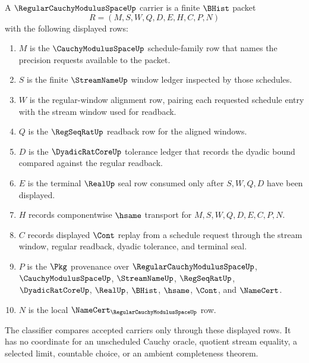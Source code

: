 \begin{definition}
\label{def:regular-cauchy-modulus-space-carrier}
A $\RegularCauchyModulusSpaceUp$ carrier is a finite $\BHist$ packet
$$
R=(M,S,W,Q,D,E,H,C,P,N)
$$
with the following displayed rows:
\begin{enumerate}
\item $M$ is the $\CauchyModulusSpaceUp$ schedule-family row that names the
precision requests available to the packet.
\item $S$ is the finite $\StreamNameUp$ window ledger inspected by those
schedules.
\item $W$ is the regular-window alignment row, pairing each requested schedule
entry with the stream window used for readback.
\item $Q$ is the $\RegSeqRatUp$ readback row for the aligned windows.
\item $D$ is the $\DyadicRatCoreUp$ tolerance ledger that records the dyadic
bound compared against the regular readback.
\item $E$ is the terminal $\RealUp$ seal row consumed only after $S,W,Q,D$ have
been displayed.
\item $H$ records componentwise $\hsame$ transport for $M,S,W,Q,D,E,C,P,N$.
\item $C$ records displayed $\Cont$ replay from a schedule request through the
stream window, regular readback, dyadic tolerance, and terminal seal.
\item $P$ is the $\Pkg$ provenance over $\RegularCauchyModulusSpaceUp$,
$\CauchyModulusSpaceUp$, $\StreamNameUp$, $\RegSeqRatUp$,
$\DyadicRatCoreUp$, $\RealUp$, $\BHist$, $\hsame$, $\Cont$, and $\NameCert$.
\item $N$ is the local $\NameCert_{\RegularCauchyModulusSpaceUp}$ row.
\end{enumerate}
The classifier compares accepted carriers only through these displayed rows. It
has no coordinate for an unscheduled Cauchy oracle, quotient stream equality, a
selected limit, countable choice, or an ambient completeness theorem.
\end{definition}

